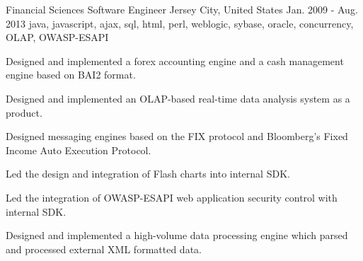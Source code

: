 \cventry
    {Financial Sciences} %
    {Software Engineer} %
    {Jersey City, United States} %
    {Jan. 2009 - Aug. 2013} %
    {java, javascript, ajax, sql, html, perl, weblogic, sybase, oracle, concurrency, OLAP, OWASP-ESAPI} %
    {
    \begin{cvitems} %
        \item {Designed and implemented a forex accounting engine and a cash management engine based on BAI2 format. }
        \item {Designed and implemented an OLAP-based real-time data analysis system as a product. }
        \item {Designed messaging engines based on the FIX protocol and Bloomberg's Fixed Income Auto Execution Protocol. }
        \item {Led the design and integration of Flash charts into internal SDK. }
        \item {Led the integration of OWASP-ESAPI web application security control with internal SDK.}
        \item {Designed and implemented a high-volume data processing engine which parsed and processed external XML formatted data. }
    \end{cvitems}
    }
